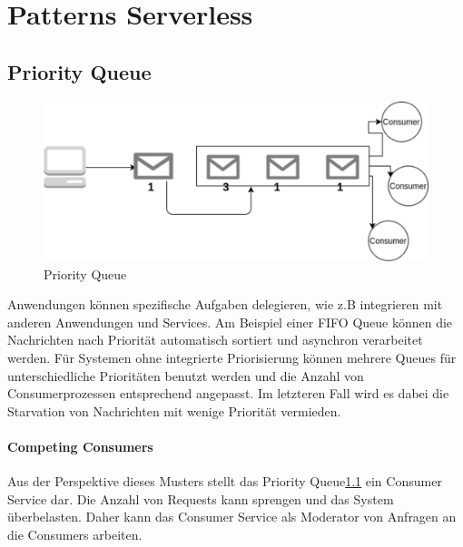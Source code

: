 \documentclass[
12pt,
english,
ngerman,
headsepline,
twoside,
openright,
numbers=noenddot,version=first
]{scrreprt}
\begin{document}
\section{Patterns Serverless}





\subsection{Priority Queue}\label{sec:priority-queue}
\begin{figure}
	\includegraphics[scale=0.36]{./pics/pattern-priority-queue.eps}
	\caption{Priority Queue}
	\label{pic:priority-queue}
\end{figure}
Anwendungen können spezifische Aufgaben delegieren, wie z.B integrieren mit anderen Anwendungen und Services. Am Beispiel einer FIFO Queue können die Nachrichten nach Priorität automatisch sortiert und asynchron verarbeitet werden. Für Systemen ohne integrierte Priorisierung können mehrere Queues für unterschiedliche Prioritäten benutzt werden und die Anzahl von Consumerprozessen entsprechend angepasst. Im letzteren Fall wird es dabei die Starvation von Nachrichten mit wenige Priorität vermieden.

\paragraph{Competing Consumers}
Aus der Perspektive dieses Musters stellt das Priority Queue\ref{sec:priority-queue} ein Consumer Service dar. Die Anzahl von Requests kann sprengen und das System überbelasten. Daher kann das Consumer Service als Moderator von Anfragen an die Consumers arbeiten. 
\end{document}
